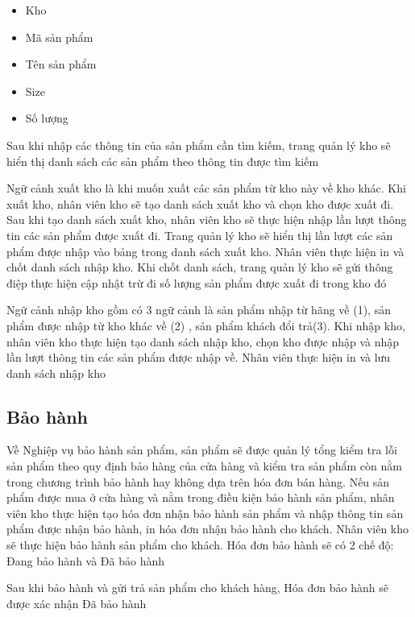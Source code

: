 \documentclass{article}
\begin{document}
\begin{itemize}
    \item Kho
    \item Mã sản phẩm
    \item Tên sản phẩm
    \item Size
    \item Số lượng 
\end{itemize}

Sau khi nhập các thông tin của sản phẩm cần tìm kiếm, trang quản lý kho sẽ hiển thị danh sách các sản phẩm theo thông tin được tìm kiếm
	
Ngữ cảnh xuất kho là khi muốn xuất các sản phẩm từ kho này về kho khác. Khi xuất kho, nhân viên kho sẽ tạo danh sách xuất kho và chọn kho được xuất đi. Sau khi tạo danh sách xuất kho, nhân viên kho sẽ thực hiện nhập lần lượt thông tin các sản phẩm được xuất đi. Trang quản lý kho sẽ hiển thị lần lượt các sản phẩm được nhập vào bảng trong danh sách xuất kho. 
Nhân viên thực hiện in và chốt danh sách nhập kho. Khi chốt danh sách, trang quản lý kho sẽ gửi thông điệp thực hiện cập nhật trừ đi số lượng sản phẩm được xuất đi trong kho đó

Ngữ cảnh nhập kho gồm có 3 ngữ cảnh là sản phẩm nhập từ hãng về (1), sản phẩm được nhập từ kho khác về (2) , sản phẩm khách đổi trả(3).
Khi nhập kho, nhân viên kho thực hiện tạo danh sách nhập kho, chọn kho được nhập và nhập lần lượt thông tin các sản phẩm được nhập về. 
Nhân viên thực hiện in và lưu danh sách nhập kho

\fontsize{14}{20}\selectfont\subsection{Bảo hành}

Về Nghiệp vụ bảo hành sản phẩm, sản phẩm sẽ được quản lý tổng kiểm tra lỗi sản phẩm theo quy định bảo hàng của cửa hàng và kiểm tra sản phẩm còn nằm trong chương trình bảo hành hay không dựa trên hóa đơn bán hàng. Nếu sản phẩm được mua ở cửa hàng và nằm trong điều kiện bảo hành sản phẩm, nhân viên kho thực hiện tạo hóa đơn nhận bảo hành sản phẩm và nhập thông tin sản phẩm được nhận bảo hành, in hóa đơn nhận bảo hành cho khách. Nhân viên kho sẽ thực hiện bảo hành sản phẩm cho khách. Hóa đơn bảo hành sẽ có 2 chế độ: Đang bảo hành và Đã bảo hành

Sau khi bảo hành và gửi trả sản phẩm cho khách hàng, Hóa đơn bảo hành sẽ được xác nhận Đã bảo hành 
        
\end{document}
